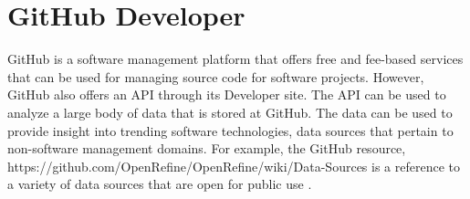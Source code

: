 \section{GitHub Developer}

GitHub is a software management platform that offers free and fee-based services that can be used
for managing source code for software projects.  However, GitHub also offers an API through its
Developer site.  The API can be used to analyze a large body of data that is stored at GitHub.
The data can be used to provide insight into trending software technologies, data sources that
pertain to non-software management domains.  For example, the GitHub resource,
https://github.com/OpenRefine/OpenRefine/wiki/Data-Sources is a reference to a variety of data
sources that are open for public use \cite{GitHub.com2018}.
